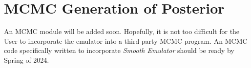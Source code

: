 \documentclass[UserManual.tex]{subfiles}
\begin{document}
\setcounter{section}{6}
\section{MCMC Generation of Posterior}\label{sec:mcmc}

An MCMC module will be added soon. Hopefully, it is not too difficult for the User to incorporate the emulator into a third-party MCMC program. An MCMC code specifically written to incorporate {\it Smooth Emulator} should be ready by Spring of 2024.
\end{document}

